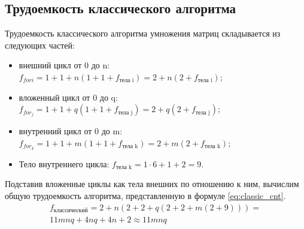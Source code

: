 \documentclass[a4paper,oneside,14pt]{extreport}
\begin{document}
\subsection{Трудоемкость классического алгоритма}
Трудоемкость классического алгоритма умножения матриц складывается из следующих частей:
\begin{itemize}
	\item внешний цикл от 0 до n: $f_{for i}=1 + 1 + n(1 + 1 + f_{\text{тела i}}) = 2 + n(2 + f_{\text{тела i}})$;
	\item вложенный цикл от 0 до q: $f_{for_j}=1 + 1 +q(1 + 1 + f_{\text{тела j}}) = 2 + q(2 + f_{\text{тела j}})$;
	\item внутренний цикл от 0 до m: $f_{for_k}=1 + 1 + m(1 + 1 + f_{\text{тела k}}) = 2 + m(2 + f_{\text{тела k}})$;
	\item Тело внутреннего цикла: $f_{\text{тела k}} = 1 \cdot 6 + 1 + 2 = 9$.
\end{itemize}

Подставив вложенные циклы как тела внешних по отношению к ним, вычислим общую трудоемкость алгоритма, представленную в формуле \ref{eq:classic_cnt}.
\begin{equation} \label{eq:classic_cnt}
\begin{array}{ll}
f_{\text{классический}} = 2 + n(2 + 2 + q(2 + 2 + m(2 + 9))) =\\
11mnq + 4nq + 4n + 2 \approx 11mnq
\end{array}
\end{equation}
\end{document}
